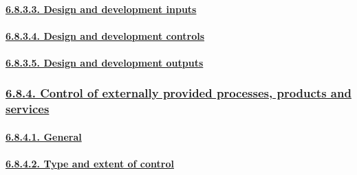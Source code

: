 \documentclass[
]{article}
\begin{document}
\hypertarget{design-and-development-inputs}{%
\paragraph{\texorpdfstring{\protect\hyperlink{design-and-development-inputs-1}{6.8.3.3.
Design and development
inputs}}{6.8.3.3. Design and development inputs}}\label{design-and-development-inputs}}

\hypertarget{design-and-development-controls}{%
\paragraph{\texorpdfstring{\protect\hyperlink{design-and-development-controls-1}{6.8.3.4.
Design and development
controls}}{6.8.3.4. Design and development controls}}\label{design-and-development-controls}}

\hypertarget{design-and-development-outputs}{%
\paragraph{\texorpdfstring{\protect\hyperlink{design-and-development-outputs-1}{6.8.3.5.
Design and development
outputs}}{6.8.3.5. Design and development outputs}}\label{design-and-development-outputs}}

\hypertarget{control-of-externally-provided-processes-products-and-services}{%
\subsubsection{\texorpdfstring{\protect\hyperlink{control-of-externally-provided-processes-products-and-services-1}{6.8.4.
Control of externally provided processes, products and
services}}{6.8.4. Control of externally provided processes, products and services}}\label{control-of-externally-provided-processes-products-and-services}}

\hypertarget{general-5}{%
\paragraph{\texorpdfstring{\protect\hyperlink{general-14}{6.8.4.1.
General}}{6.8.4.1. General}}\label{general-5}}

\hypertarget{type-and-extent-of-control}{%
\paragraph{\texorpdfstring{\protect\hyperlink{type-and-extent-of-control-1}{6.8.4.2.
Type and extent of
control}}{6.8.4.2. Type and extent of control}}\label{type-and-extent-of-control}}
\end{document}
